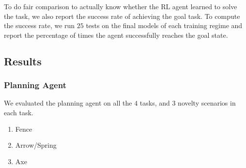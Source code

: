 \documentclass[sigconf]{aamas}
\begin{document}
To do fair comparison to actually know whether the RL agent learned to solve the task, we also report the success rate of achieving the goal task. To compute the success rate, we run $25$ tests on the final models of each training regime and report the percentage of times the agent successfully reaches the goal state.

\subsection{Results}
\label{sec:results}
\subsubsection{Planning Agent}
We evaluated the planning agent on all the $4$ tasks, and $3$ novelty scenarios in each task.
\begin{enumerate}
    \item Fence
    \item Arrow/Spring
    \item Axe
\end{enumerate}
\end{document}
